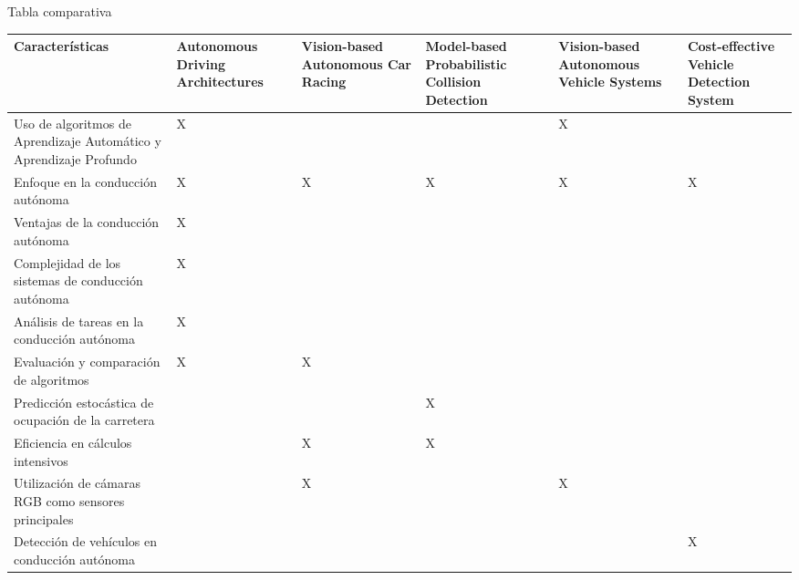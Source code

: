\documentclass[8pt]{beamer}
\begin{document}
    \begin{frame}{Tabla comparativa}
        \begin{table}
            \footnotesize
            \begin{tabular}{|p{3cm}|p{1.2cm}|p{1.2cm}|p{1.2cm}|p{1.2cm}|p{1.2cm}|}
                \hline
                \textbf{Características}
                & \textbf{Autonomous Driving Architectures}
                & \textbf{Vision-based Autonomous Car Racing}
                & \textbf{Model-based Probabilistic Collision Detection}
                & \textbf{Vision-based Autonomous Vehicle Systems}
                & \textbf{Cost-effective Vehicle Detection System} \\
                \hline
                Uso de algoritmos de Aprendizaje Automático y Aprendizaje Profundo & X &   &   & X &   \\
                \hline
                Enfoque en la conducción autónoma                                  & X & X & X & X & X \\
                \hline
                Ventajas de la conducción autónoma                                 & X &   &   &   &   \\
                \hline
                Complejidad de los sistemas de conducción autónoma                 & X &   &   &   &   \\
                \hline
                Análisis de tareas en la conducción autónoma                       & X &   &   &   &   \\
                \hline
                Evaluación y comparación de algoritmos                             & X & X &   &   &   \\
                \hline
                Predicción estocástica de ocupación de la carretera                &   &   & X &   &   \\
                \hline
                Eficiencia en cálculos intensivos                                  &   & X & X &   &   \\
                \hline
                Utilización de cámaras RGB como sensores principales               &   & X &   & X &   \\
                \hline
                Detección de vehículos en conducción autónoma                      &   &   &   &   & X \\
                \hline
            \end{tabular}
        \end{table}
    \end{frame}
    
\end{document}

